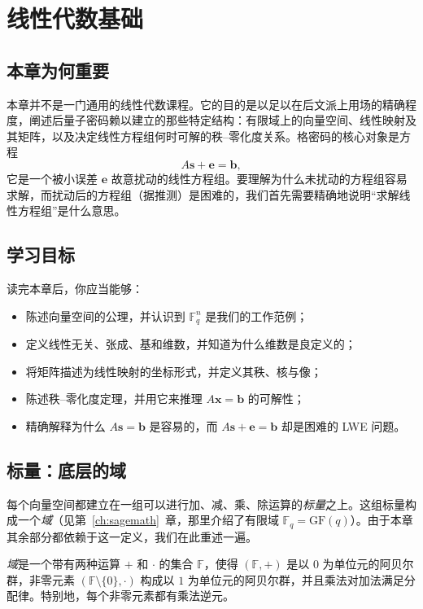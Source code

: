 \chapter{线性代数基础}
\label{ch:linalg}

\section{本章为何重要}
本章并不是一门通用的线性代数课程。它的目的是以足以在后文派上用场的精确程度，阐述后量子密码赖以建立的那些特定结构：有限域上的向量空间、线性映射及其矩阵，以及决定线性方程组何时可解的秩--零化度关系。格密码的核心对象是方程
\[
A\mathbf{s} + \mathbf{e} = \mathbf{b},
\]
它是一个被小误差 $\mathbf{e}$ 故意扰动的线性方程组。要理解为什么未扰动的方程组容易求解，而扰动后的方程组（据推测）是困难的，我们首先需要精确地说明“求解线性方程组”是什么意思。

\section{学习目标}
读完本章后，你应当能够：

\begin{itemize}
  \item 陈述向量空间的公理，并认识到 $\mathbb{F}_q^n$ 是我们的工作范例；
  \item 定义线性无关、张成、基和维数，并知道为什么维数是良定义的；
  \item 将矩阵描述为线性映射的坐标形式，并定义其秩、核与像；
  \item 陈述秩--零化度定理，并用它来推理 $A\mathbf{x}=\mathbf{b}$ 的可解性；
  \item 精确解释为什么 $A\mathbf{s}=\mathbf{b}$ 是容易的，而 $A\mathbf{s}+\mathbf{e}=\mathbf{b}$ 却是困难的 LWE 问题。
\end{itemize}

\section{标量：底层的域}
每个向量空间都建立在一组可以进行加、减、乘、除运算的\emph{标量}之上。这组标量构成一个\emph{域}（见第~\ref{ch:sagemath}~章，那里介绍了有限域 $\mathbb{F}_q = \mathrm{GF}(q)$）。由于本章其余部分都依赖于这一定义，我们在此重述一遍。

\begin{definition}[域]
\emph{域}是一个带有两种运算 $+$ 和 $\cdot$ 的集合 $\mathbb{F}$，使得 $(\mathbb{F},+)$ 是以 $0$ 为单位元的阿贝尔群，非零元素 $(\mathbb{F}\setminus\{0\},\cdot)$ 构成以 $1$ 为单位元的阿贝尔群，并且乘法对加法满足分配律。特别地，每个非零元素都有乘法逆元。
\end{definition}

